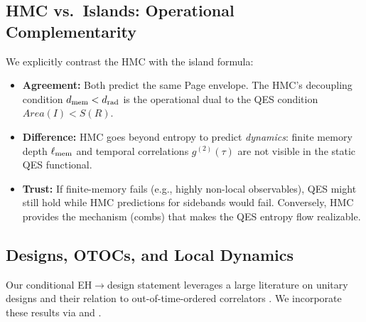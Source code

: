 \documentclass[aps,prd,preprint,onecolumn,superscriptaddress,nofootinbib,longbibliography,floatfix,11pt,showpacs,showkeys]{revtex4-2}
\theoremstyle{plain}
\theoremstyle{definition}
\theoremstyle{remark}
\begin{document}
\subsection{HMC vs.\ Islands: Operational Complementarity}
We explicitly contrast the HMC with the island formula:
\begin{itemize}
    \item \textbf{Agreement:} Both predict the same Page envelope. The HMC's decoupling condition $d_{\rm mem} < d_{\rm rad}$ is the operational dual to the QES condition $Area(I) < S(R)$.
    \item \textbf{Difference:} HMC goes beyond entropy to predict \emph{dynamics}: finite memory depth $\ell_{\rm mem}$ and temporal correlations $g^{(2)}(\tau)$ are not visible in the static QES functional.
    \item \textbf{Trust:} If finite-memory fails (e.g., highly non-local observables), QES might still hold while HMC predictions for sidebands would fail. Conversely, HMC provides the mechanism (combs) that makes the QES entropy flow realizable.
\end{itemize}

\subsection{Designs, OTOCs, and Local Dynamics}
Our conditional EH$\to$design statement leverages a large literature on unitary designs
\cite{Dankert:2009,HarrowLow:2009,Brandao:2016,HunterJones:2019} and their relation to out-of-time-ordered correlators
\cite{RobertsYoshida:2017,Cotler:2017}.
We incorporate these results via  and .
\end{document}
